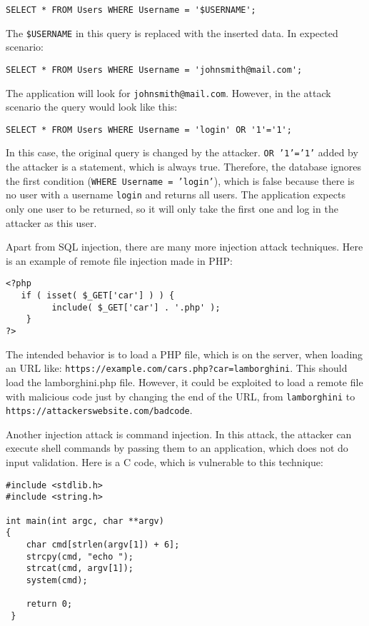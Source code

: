 \documentclass[a4paper]{article}
\begin{document}
\begin{verbatim}
SELECT * FROM Users WHERE Username = '$USERNAME';
\end{verbatim}

The \texttt{\$USERNAME} in this query is replaced with the inserted data. In
expected scenario:

\begin{verbatim}
SELECT * FROM Users WHERE Username = 'johnsmith@mail.com';
\end{verbatim}

The application will look for \texttt{johnsmith@mail.com}. However, in the
attack scenario the query would look like this:

\begin{verbatim}
SELECT * FROM Users WHERE Username = 'login' OR '1'='1';
\end{verbatim}

In this case, the original query is changed by the attacker. \texttt{OR
'1'='1'} added by the attacker is a statement, which is always true. Therefore,
the database ignores the first condition (\texttt{WHERE Username = 'login'}),
which is false because there is no user with a username \texttt{login} and
returns all users. The application expects only one user to be returned, so it
will only take the first one and log in the attacker as this user.

Apart from SQL injection, there are many more injection attack techniques. Here
is an example of remote file injection made in PHP:

\begin{verbatim}
<?php
   if ( isset( $_GET['car'] ) ) {
         include( $_GET['car'] . '.php' );
    }
?>
\end{verbatim}

The intended behavior is to load a PHP file, which is on the server, when
loading an URL like: \texttt{https://example.com/cars.php?car=lamborghini}.
This should load the lamborghini.php file. However, it could be exploited to
load a remote file with malicious code just by changing the end of the URL,
from \texttt{lamborghini} to \texttt{https://attackerswebsite.com/badcode}.

Another injection attack is command injection. In this attack, the attacker can
execute shell commands by passing them to an application, which does not do
input validation. Here is a C code, which is vulnerable to this technique:

\begin{verbatim}
#include <stdlib.h>
#include <string.h>

int main(int argc, char **argv)
{
	char cmd[strlen(argv[1]) + 6];
	strcpy(cmd, "echo ");
	strcat(cmd, argv[1]);
	system(cmd);
        
	return 0;
 }
\end{verbatim}
\end{document}
